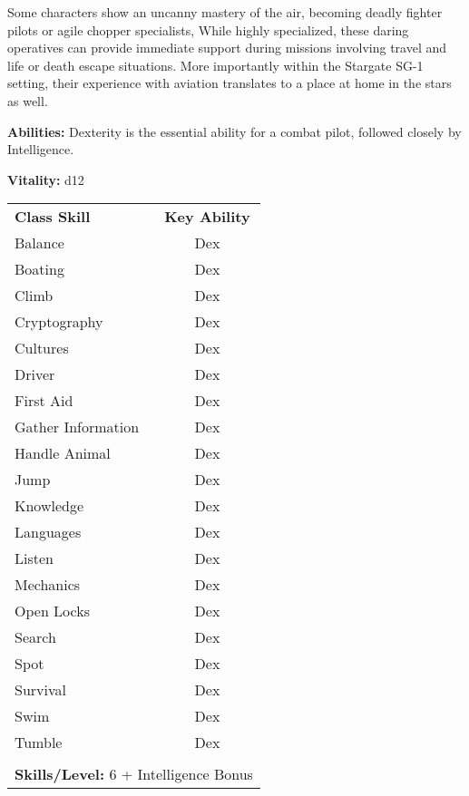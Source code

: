 \begin{multicols}{2}

Some characters show an uncanny mastery of the air, becoming deadly fighter pilots or agile chopper specialists, While highly specialized, these daring operatives can provide immediate support during missions involving travel and life or death escape situations. More importantly within the Stargate SG-1 setting, their experience with aviation translates to a place at home in the stars as well.

\textbf{Abilities:} Dexterity is the essential ability for a combat pilot, followed closely by Intelligence.

\textbf{Vitality:} d12

\end{multicols}

\begin{table}[htb]
\raggedright
\begin{tabular}{l c}
\textbf{Class Skill} & \textbf{Key Ability}\\

Balance & Dex\\
Boating & Dex\\
Climb & Dex\\
Cryptography & Dex\\
Cultures & Dex\\
Driver & Dex\\
First Aid & Dex\\
Gather Information & Dex\\
Handle Animal & Dex\\
Jump & Dex\\
Knowledge & Dex\\
Languages & Dex\\
Listen & Dex\\
Mechanics & Dex\\
Open Locks & Dex\\
Search & Dex\\
Spot & Dex\\
Survival & Dex\\
Swim & Dex\\
Tumble & Dex\\

\multicolumn{2}{l}{\cellcolor{white}}\\
\multicolumn{2}{l}{\cellcolor{white}\textbf{Skills/Level:} 6 + Intelligence Bonus}\\
\end{tabular}
\end{table}

